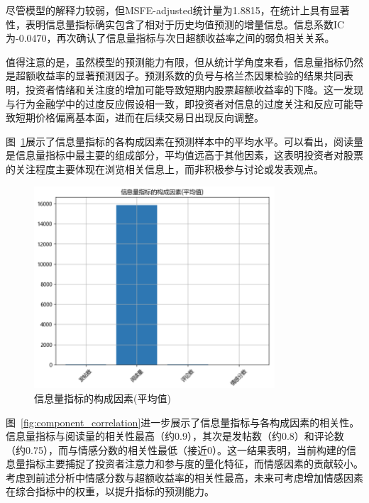 \documentclass[12pt, a4paper]{article}
\begin{document}
尽管模型的解释力较弱，但MSFE-adjusted统计量为1.8815，在统计上具有显著性，表明信息量指标确实包含了相对于历史均值预测的增量信息。信息系数IC为-0.0470，再次确认了信息量指标与次日超额收益率之间的弱负相关关系。

值得注意的是，虽然模型的预测能力有限，但从统计学角度来看，信息量指标仍然是超额收益率的显著预测因子。预测系数的负号与格兰杰因果检验的结果共同表明，投资者情绪和关注度的增加可能导致短期内股票超额收益率的下降。这一发现与行为金融学中的过度反应假设相一致，即投资者对信息的过度关注和反应可能导致短期价格偏离基本面，进而在后续交易日出现反向调整。

图~\ref{fig:info_components}展示了信息量指标的各构成因素在预测样本中的平均水平。可以看出，阅读量是信息量指标中最主要的组成部分，平均值远高于其他因素，这表明投资者对股票的关注程度主要体现在浏览相关信息上，而非积极参与讨论或发表观点。

\begin{figure}[htbp]
\centering
\includegraphics[width=0.8\textwidth]{fig/info_components.png}
\caption{信息量指标的构成因素(平均值)}
\label{fig:info_components}
\end{figure}

图~\ref{fig:component_correlation}进一步展示了信息量指标与各构成因素的相关性。信息量指标与阅读量的相关性最高（约0.9），其次是发帖数（约0.8）和评论数（约0.75），而与情感分数的相关性最低（接近0）。这一结果表明，当前构建的信息量指标主要捕捉了投资者注意力和参与度的量化特征，而情感因素的贡献较小。考虑到前述分析中情感分数与超额收益率的相关性最高，未来可考虑增加情感因素在综合指标中的权重，以提升指标的预测能力。
\end{document}
